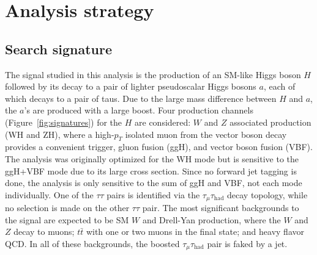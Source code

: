 \chapter{Analysis strategy\label{sec:strategy}}

\section{Search signature\label{sec:signature}}
The signal studied in this analysis is the production of an SM-like Higgs boson $H$ followed by its decay to a pair of lighter pseudoscalar Higgs bosons $a$, each of which decays to a pair of taus. Due to the large mass difference between $H$ and $a$, the $a$'s are produced with a large boost. Four production channels (Figure~\ref{fig:signatures}) for the $H$ are considered: $W$ and $Z$ associated production (WH and ZH), where a high-$p_T$ isolated muon from the vector boson decay provides a convenient trigger, gluon fusion (ggH), and vector boson fusion (VBF). The analysis was originally optimized for the WH mode but is sensitive to the ggH+VBF mode due to its large cross section. Since no forward jet tagging is done, the analysis is only sensitive to the sum of ggH and VBF, not each mode individually.  One of the $\tau\tau$ pairs is identified via the $\tau_{\mu}\tau_{\text{had}}$ decay topology, while no selection is made on the other $\tau\tau$ pair. The most significant backgrounds to the signal are expected to be SM $W$ and Drell-Yan production, where the $W$ and $Z$ decay to muons; $t\bar{t}$ with one or two muons in the final state; and heavy flavor QCD. In all of these backgrounds, the boosted $\tau_{\mu}\tau_{\text{had}}$ pair is faked by a jet.

